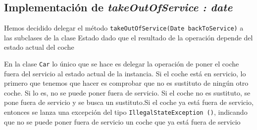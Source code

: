 \subsection{Implementación de \textit{takeOutOfService : date}}

Hemos decidido delegar el método \texttt{takeOutOfService(Date backToService)}  a las subclases de la clase Estado dado que el resultado de la operación depende del estado actual del coche
\vspace{0.5cm}

\vspace{0.5cm}
En la clase \texttt{Car} lo único que se hace es delegar la operación de poner el coche fuera del servicio al estado actual de la instancia.\vspace{0.2cm} Si el coche está en servicio, lo primero que tenemos que hacer es comprobar que no es sustituto de ningún otro coche. Si lo es, no se puede poner fuera de servicio.\vspace{0.2cm} Si el coche no es sustituto, se pone fuera de servicio y se busca un sustituto.\vspace{0.2cm}Si el coche ya está fuera de servicio, entonces se lanza una excepción del tipo \texttt{IllegalStateException ()}, indicando que no se puede poner fuera de servicio un coche que ya está fuera de servicio 

